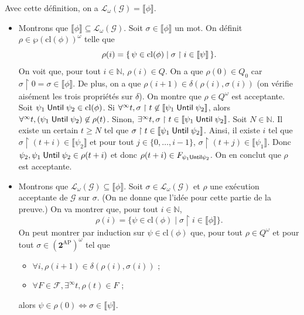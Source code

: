 \documentclass[./main]{subfiles}
\begin{document}
  \begin{thm}
    Avec cette définition, on a $\mathcal{L}_\omega(\mathcal{G}) = \llbracket \phi\rrbracket$.
  \end{thm}
  \begin{prv}
    \begin{itemize}
      \item Montrons que $\llbracket \phi\rrbracket  \subseteq \mathcal{L}_\omega(\mathcal{G})$.
        Soit $\sigma \in \llbracket \phi\rrbracket$ un mot.
        On définit~$\rho \in \wp(\mathrm{cl}(\phi))^\omega$ telle que 
        \[
        \rho(i) = \mleft\{\,\psi \in \mathrm{cl}(\phi) \;\middle|\; \sigma \upharpoonright i \in \llbracket \psi\rrbracket \,\mright\} 
        .\] 
        On voit que, pour tout $i \in \mathds{N}$, $\rho(i) \in Q$.
        On a que $\rho(0) \in Q_0$ car $\sigma \upharpoonright 0 = \sigma \in \llbracket \phi\rrbracket$.
        De plus, on a que $\rho(i+1) \in \delta(\rho(i), \sigma(i))$ (on vérifie aisément les trois propriétés sur $\delta$).
        On montre que $\rho \in Q^\omega$ est acceptante.
        Soit $\psi_1 \mathrel{\mathsf{Until}} \psi_2 \in \mathrm{cl}(\phi)$.
        Si $\forall^\infty t, \sigma \upharpoonright t \not\in \llbracket \psi_1 \mathrel{\mathsf{Until}} \psi_2\rrbracket$, alors $\forall^\infty t, (\psi_1 \mathrel{\mathsf{Until}} \psi_2) \not\in  \rho(t)$.
        Sinon, $\exists^\infty t, \sigma \upharpoonright t \in \llbracket \psi_1 \mathrel{\mathsf{Until}} \psi_2\rrbracket$.
        Soit $N \in \mathds{N}$. Il existe un certain $t \ge N$ tel que $\sigma \upharpoonright t \in \llbracket \psi_1 \mathrel{\mathsf{Until}} \psi_2\rrbracket$.
        Ainsi, il existe  $i$ tel que $\sigma \upharpoonright (t+i) \in \llbracket \psi_2\rrbracket$ et pour tout $j \in \{0, \ldots, i-1\}$, $\sigma \upharpoonright (t+j) \in \llbracket \psi_1\rrbracket$.
        Donc $\psi_2, \psi_1 \mathrel{\mathsf{Until}} \psi_2 \in \rho(t+i)$ et donc $\rho(t+i) \in F_{\psi_1 \mathrel{\mathsf{Until}} \psi_2}$.
        On en conclut que $\rho$ est acceptante.
      \item Montrons que $\mathcal{L}_\omega(\mathcal{G}) \subseteq \llbracket \phi\rrbracket$.
        Soit $\sigma \in \mathcal{L}_\omega(\mathcal{G})$ et $\rho$ une exécution acceptante de $\mathcal{G}$ sur $\sigma$.
        (On ne donne que l'idée pour cette partie de la preuve.)
        On va montrer que, pour tout $i \in \mathds{N}$,
        \[
        \rho(i) = \{\psi \in \mathrm{cl}(\phi)  \mid \sigma \upharpoonright i \in \llbracket \phi\rrbracket  \} 
        .\]
        On peut montrer par induction sur $\psi \in \mathrm{cl}(\phi)$ que, pour tout $\rho \in Q^\omega$ et pour tout $\sigma \in (\mathbf{2}^\mathrm{AP})^\omega$ tel que
        \begin{itemize}
          \item $\forall i, \rho(i+1) \in \delta(\rho(i), \sigma(i))$ ;
          \item $\forall F \in \mathcal{F}, \exists^\infty t, \rho(t) \in F$ ;
        \end{itemize}
        alors $\psi \in \rho(0) \iff \sigma \in \llbracket \psi\rrbracket$.
    \end{itemize}
  \end{prv}
\end{document}
